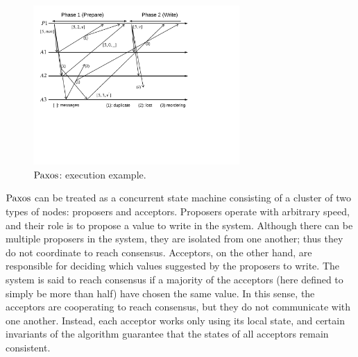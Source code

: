\begin{figure}
\begin{center}
\includegraphics[width=0.7\textwidth]{figs/multipaxos/paxos_example_nowitness}
\end{center}
\caption{$\mathrm{Paxos}$: execution example.}
\label{fig:chapter:multipaxos:paxos-example}
\end{figure}

$\mathrm{Paxos}$ can be treated as a concurrent state machine consisting of a cluster of two types of nodes: proposers and acceptors.
Proposers operate with arbitrary speed, and their role is to propose a value to write in the system.
Although there can be multiple proposers in the system, they are isolated from one another;
thus they do not coordinate to reach consensus.
Acceptors, on the other hand, are responsible for deciding which values suggested by the proposers to write.
The system is said to reach consensus if a majority of the acceptors (here defined to simply be more than half) have chosen the same value.
In this sense, the acceptors are cooperating to reach consensus, but they do not communicate with one another.
Instead, each acceptor works only using its local state, and certain invariants of the algorithm guarantee that the states of all acceptors remain consistent.

